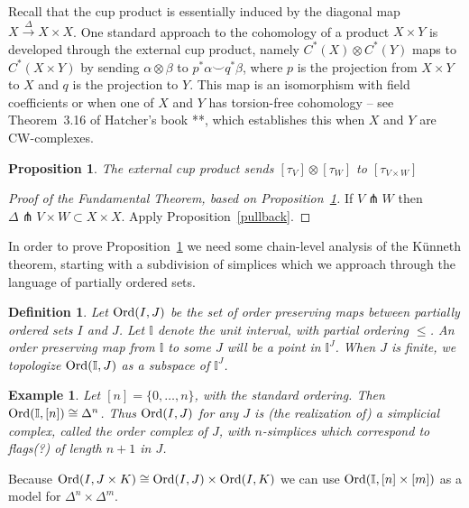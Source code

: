 \documentclass{amsart}          %
\newtheorem{proposition}[theorem]{Proposition}
\newtheorem{definition}[theorem]{Definition}
\newtheorem{example}[theorem]{Example}
\newcommand{\I}{\mathbb I}
\begin{document}
Recall that the cup product is essentially induced by the diagonal map $X \overset{\Delta}{\to} X \times X$.  One standard
approach to the cohomology of a product $X \times Y$ is developed through the external cup product, namely $C^*(X) \otimes C^*(Y)$
maps to $C^*(X \times Y)$ by sending $\alpha  \otimes \beta$ to $p^* \alpha \smile q^*\beta$, where $p$ is the projection from 
$X \times Y$ to $X$ and $q$ is the projection to $Y$.  This map is an isomorphism with field coefficients or when 
one of $X$ and $Y$ has torsion-free cohomology -- see Theorem~3.16 of Hatcher's book **, which establishes this when $X$ and
$Y$ are CW-complexes.

\begin{proposition}\label{externalcup}
The external cup product sends $[\tau_V] \otimes [\tau_W]$ to $[\tau_{V \times W}]$
\end{proposition}

\begin{proof}[Proof of the Fundamental Theorem, based on Proposition~\ref{externalcup}]
If $V \pitchfork W$ then $\Delta \pitchfork V \times W \subset X \times X$.  Apply Proposition~\ref{pullback}.
\end{proof}


In order to prove Proposition~\ref{externalcup} we need some chain-level analysis of the K\"unneth theorem, starting with 
a subdivision of simplices which we approach through the language of partially ordered sets.

\begin{definition}
Let ${\rm Ord}(I,J)$ be the set of order preserving maps between partially ordered sets $I$ and $J$.  Let $\I$ denote the unit interval,
with partial ordering $\leq$.  An order preserving map from $\I$ to some $J$ will be a point in  $\I^J$.  When $J$ is finite, we topologize
${\rm Ord}(\I, J)$ as a subspace of $\I^J$.
\end{definition}

\begin{example}
Let $[n] = \{0, \ldots, n\}$, with the standard ordering.  Then ${\rm Ord}(\I, [n]) \cong \Delta^n$.  Thus  ${\rm Ord}(I,J)$ for any $J$
is (the realization of) a simplicial complex, called the order complex of $J$, with $n$-simplices which correspond to flags(?)
of length $n + 1$ in $J$.
\end{example}

Because ${\rm Ord}(I,J \times K) \cong {\rm Ord}(I,J) \times {\rm Ord}(I,K)$ we can use ${\rm Ord}(\I,[n] \times [m])$
as a model for $\Delta^n \times \Delta^m$.   
\end{document}
